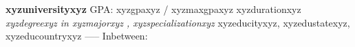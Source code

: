 \item \textbf{xyzuniversityxyz} GPA: xyzgpaxyz / xyzmaxgpaxyz  \hfill xyzdurationxyz \\
\textit{xyzdegreexyz in xyzmajorxyz , xyzspecializationxyz} \hfill xyzeducityxyz, xyzedustatexyz, xyzeducountryxyz
-----
Inbetween: \vspace{5pt}
